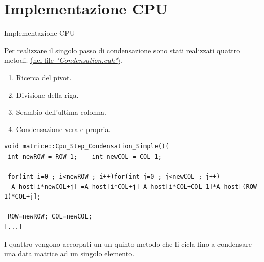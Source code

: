 \documentclass{beamer} %
\begin{document}
\section{Implementazione CPU}
\begin{frame}[fragile]{Implementazione CPU}

Per realizzare il singolo passo di condensazione sono stati realizzati quattro metodi. \href{run:/home/tony/CudaCorso/ProgettoFinale/CudaMatrixClass/Src/Condensation.cuh}{\tiny (nel file \color{red}  \emph{"Condensation.cuh"})}.\pause

\begin{enumerate}
\item Ricerca del pivot.\pause
\item Divisione della riga.\pause
\item Scambio dell'ultima colonna.\pause
\item Condensazione vera e propria.
\end{enumerate}

\begin{lstlisting}
void matrice::Cpu_Step_Condensation_Simple(){
 int newROW = ROW-1;	int newCOL = COL-1;	

 for(int i=0 ; i<newROW ; i++)for(int j=0 ; j<newCOL ; j++)
  A_host[i*newCOL+j] =A_host[i*COL+j]-A_host[i*COL+COL-1]*A_host[(ROW-1)*COL+j];

 ROW=newROW; COL=newCOL;
[...]
\end{lstlisting}\pause 

I quattro vengono accorpati un un quinto metodo che li cicla fino a condensare una data matrice ad un singolo elemento.
\end{frame}
\end{document}
